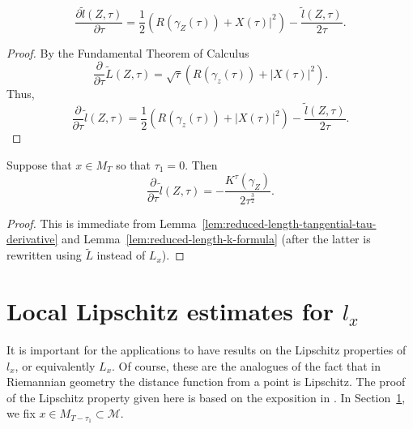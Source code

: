 \begin{lemma}\label{lem:reduced-length-tangential-tau-derivative}
\label{tildeltau}
$$\frac{\partial \widetilde
l(Z,\tau)}{\partial
\tau}=\frac{1}{2}\left(R(\gamma_Z(\tau))+X(\tau)|^2\right)-\frac{\widetilde
l(Z,\tau)}{2\tau}.$$
\end{lemma}

\begin{proof}
\sketch
{}
By the Fundamental Theorem of Calculus
$$\frac{\partial}{\partial\tau}\widetilde L(Z,\tau)=\sqrt{\tau}\left(R(\gamma_z(\tau))+|X(\tau)|^2\right).$$
Thus,
$$\frac{\partial}{\partial\tau}\widetilde l(Z,\tau)=\frac{1}{2}\left(R(\gamma_z(\tau))+|X(\tau)|^2\right)
-\frac{\widetilde l(Z,\tau)}{2\tau}.$$
\end{proof}

\begin{corollary}\label{cor:reduced-length-tangential-k-derivative}
\label{tildelK}
Suppose that $x\in M_T$ so that
$\tau_1=0$. Then
$$\frac{\partial}{\partial\tau}\widetilde
l(Z,\tau)=-\frac{K^\tau(\gamma_Z)}{2\tau^{\frac{3}{2}}}.$$
\end{corollary}

\begin{proof}
\sketch
{}
This is immediate from Lemma~\ref{lem:reduced-length-tangential-tau-derivative} and Lemma~\ref{lem:reduced-length-k-formula} (after the
latter is rewritten using $\widetilde L$ instead of $L_x$).
\end{proof}



\section{Local Lipschitz estimates for $l_x$}\label{sect:lips}

It is important for the applications to have results on the
Lipschitz properties of $l_x$, or equivalently $L_x$. Of course,
these are the analogues of the fact that in Riemannian geometry the
distance function from a point is Lipschitz. The proof of the
Lipschitz property given here is based on the exposition in
\cite{Ye}. In Section~\ref{sect:lips}, we fix $x\in
M_{T-\tau_1}\subset {\mathcal M}$.

